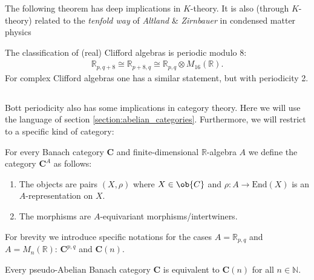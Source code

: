     The following theorem has deep implications in $K$-theory. It is also (through $K$-theory) related to the \textit{tenfold way} of \textit{Altland} \& \textit{Zirnbauer} in condensed matter physics
    \begin{theorem}\label{clifford:bott_periodicity}
        The classification of (real) Clifford algebras is periodic modulo 8:
        \begin{gather}
            \mathbb{R}_{p,q+8}\cong\mathbb{R}_{p+8,q}\cong\mathbb{R}_{p,q}\otimes M_{16}(\mathbb{R}).
        \end{gather}
        For complex Clifford algebras one has a similar statement, but with periodicity 2.
    \end{theorem}

\subsection{}\label{section:clifford_bott}

    Bott periodicity also has some implications in category theory. Here we will use the language of section \ref{section:abelian_categories}. Furthermore, we will restrict to a specific kind of category:

    For every Banach category $\mathbf{C}$ and finite-dimensional $\mathbb{R}$-algebra $A$ we define the category $\mathbf{C}^A$ as follows:
    \begin{enumerate}
        \item The objects are pairs $(X,\rho)$ where $X\in\ob{C}$ and $\rho:A\rightarrow\text{End}(X)$ is an $A$-representation on $X$.
        \item The morphisms are $A$-equivariant morphisms/intertwiners.
    \end{enumerate}
    \begin{notation}
        For brevity we introduce specific notations for the cases $A=\mathbb{R}_{p,q}$ and $A=M_n(\mathbb{R})$: $\mathbf{C}^{p,q}$ and $\mathbf{C}(n)$.
    \end{notation}

    \begin{property}
        Every pseudo-Abelian Banach category $\mathbf{C}$ is equivalent to $\mathbf{C}(n)$ for all $n\in\mathbb{N}$.
    \end{property}

